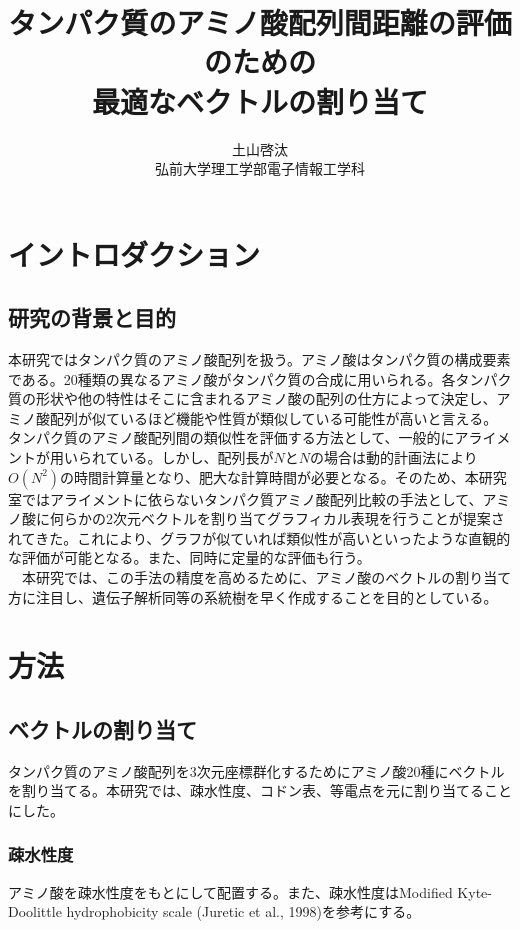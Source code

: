 \documentclass[a4paper,12pt]{jsreport}
\title{タンパク質のアミノ酸配列間距離の評価のための\\
最適なベクトルの割り当て}
\author{土山啓汰\\
弘前大学理工学部電子情報工学科}
\begin{document}
\maketitle
\tableofcontents


\chapter{イントロダクション}

\section{研究の背景と目的}
本研究ではタンパク質のアミノ酸配列を扱う。アミノ酸はタンパク質の構成要素である。20種類の異なるアミノ酸がタンパク質の合成に用いられる。各タンパク質の形状や他の特性はそこに含まれるアミノ酸の配列の仕方によって決定し、アミノ酸配列が似ているほど機能や性質が類似している可能性が高いと言える。 \\
タンパク質のアミノ酸配列間の類似性を評価する方法として、一般的にアライメントが用いられている。しかし、配列長が$N$と$N$の場合は動的計画法により$O(N^2)$の時間計算量となり、肥大な計算時間が必要となる。そのため、本研究室ではアライメントに依らないタンパク質アミノ酸配列比較の手法として、アミノ酸に何らかの2次元ベクトルを割り当てグラフィカル表現を行うことが提案されてきた。これにより、グラフが似ていれば類似性が高いといったような直観的な評価が可能となる。また、同時に定量的な評価も行う。\\
　本研究では、この手法の精度を高めるために、アミノ酸のベクトルの割り当て方に注目し、遺伝子解析同等の系統樹を早く作成することを目的としている。


\chapter{方法}

\section{ベクトルの割り当て}

タンパク質のアミノ酸配列を3次元座標群化するためにアミノ酸20種にベクトルを割り当てる。本研究では、疎水性度、コドン表、等電点を元に割り当てることにした。

\subsection{疎水性度}
アミノ酸を疎水性度をもとにして配置する。また、疎水性度はModified Kyte-Doolittle hydrophobicity scale (Juretic et al., 1998)を参考にする。
\end{document}
